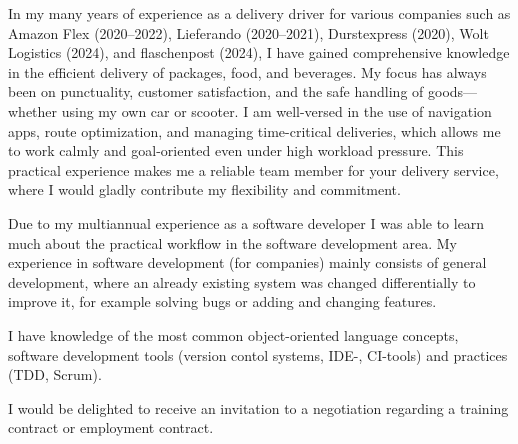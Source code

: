         In my many years of experience as a delivery driver for various companies such as Amazon Flex (2020–2022), Lieferando (2020–2021), Durstexpress (2020), Wolt Logistics (2024), and flaschenpost (2024), I have gained comprehensive knowledge in the efficient delivery of packages, food, and beverages.
		My focus has always been on punctuality, customer satisfaction, and the safe handling of goods—whether using my own car or scooter.
		I am well-versed in the use of navigation apps, route optimization, and managing time-critical deliveries, which allows me to work calmly and goal-oriented even under high workload pressure.
		This practical experience makes me a reliable team member for your delivery service, where I would gladly contribute my flexibility and commitment.

        Due to my multiannual experience as a software developer I was able to learn much about the practical workflow in the software development area.
		My experience in software development (for companies) mainly consists of general development, where an already existing system was changed differentially to improve it, for example solving bugs or adding and changing features.

        I have knowledge of the most common object-oriented language concepts, software development tools (version contol systems, IDE-, CI-tools) and practices (TDD, Scrum).

        I would be delighted to receive an invitation to a negotiation regarding a training contract or employment contract.
\versionLanguageEnd
